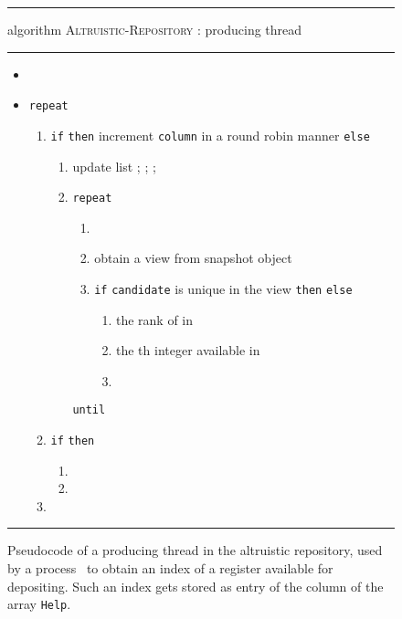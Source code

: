 \documentclass[11pt]{article}
\newcommand{\FF}{\vspace*{\medskipamount}}
\begin{document}
\begin{figure}[t]
\hrule

\FF

\textsf{algorithm} \textsc{Altruistic-Repository} : producing thread

\FF

\hrule

\FF

\begin{itemize}[nosep]
\item[]

\item[]
\texttt{repeat}
\begin{enumerate}[nosep]
\item
\texttt{if}  \texttt{then} increment \texttt{column} in a round robin manner \texttt{else}
\begin{enumerate}
\item
update list ; 
;
; 
\item
\texttt{repeat}
\begin{enumerate}[nosep]
\item

\item
obtain a view  from snapshot object 
\item
\texttt{if} \texttt{candidate} is unique in the view  \texttt{then}  \texttt{else} 
\begin{enumerate}[nosep]
\item
 the rank of  in  
\item
  the th integer available in 
\item

\end{enumerate}
\end{enumerate}
\texttt{until} 

\end{enumerate}
\item
\label{altruistic-verify-availability}
\texttt{if}  \texttt{then} 
\begin{enumerate}[nosep]
\item

\item

\end{enumerate}
 \item 

\end{enumerate}
\end{itemize}
\FF

\hrule

\FF

\caption{\label{fig:alg-altruistic-repository-produce}
Pseudocode of a producing thread in the altruistic repository, used by a process~ to obtain an index of a register available for depositing.
Such an index gets stored as entry  of the column  of the array \texttt{Help}.}
\end{figure}
\end{document}
